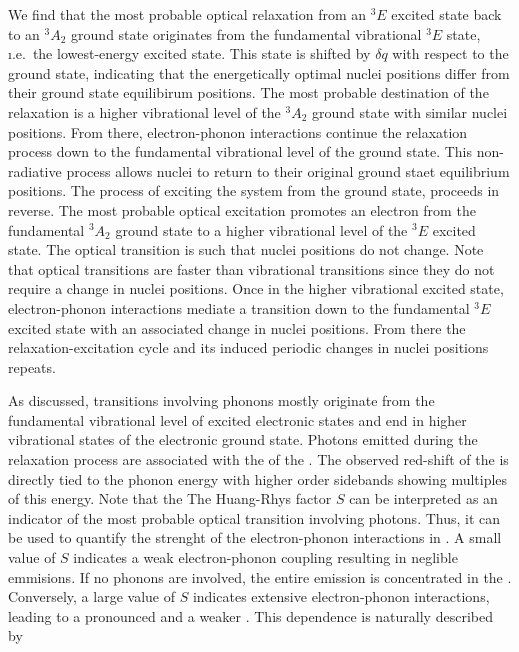    We find that the most probable optical relaxation from an ${}^{3}E$ excited state back to an ${}^{3}A_{2}$ ground state originates from the fundamental vibrational ${}^{3}E$ state, \i.e.\ the lowest-energy excited state. This state is shifted by $\delta q$ with respect to the ground state, indicating that the energetically optimal nuclei positions differ from their ground state equilibirum positions. The most probable destination of the relaxation is a higher vibrational level of the ${}^{3}A_{2}$ ground state with similar nuclei positions. From there, electron-phonon interactions continue the relaxation process down to the fundamental vibrational level of the ground state. This non-radiative process allows nuclei to return to their original ground staet equilibrium positions. The process of exciting the system from the ground state, proceeds in reverse. The most probable optical excitation promotes an electron from the fundamental ${}^{3}A_{2}$ ground state to a higher vibrational level of the ${}^{3}E$ excited state. The optical transition is such that nuclei positions do not change. Note that optical transitions are faster than vibrational transitions since they do not require a change in nuclei positions. Once in the higher vibrational excited state, electron-phonon interactions mediate a transition down to the fundamental ${}^{3}E$ excited state with an associated change in nuclei positions. From there the relaxation-excitation cycle and its induced periodic changes in nuclei positions repeats.

   As discussed, transitions involving phonons mostly originate from the fundamental vibrational level of excited electronic states and end in higher vibrational states of the electronic ground state. Photons emitted during the relaxation process are associated with the \psb of the \siv.
   The observed red-shift of the \psb is directly tied to the phonon energy with higher order sidebands showing multiples of this energy. Note that the The Huang-Rhys factor $S$ can be interpreted as an indicator of the most probable optical transition involving photons. Thus, it can be used to quantify the strenght of the electron-phonon interactions in \sivs. A small value of $S$ indicates a weak electron-phonon coupling resulting in neglible \psb emmisions. If no phonons are involved, the entire emission is concentrated in the \zpl. Conversely, a large value of $S$ indicates extensive electron-phonon interactions, leading to a pronounced \psb and a weaker \zpl. This dependence is naturally described by

